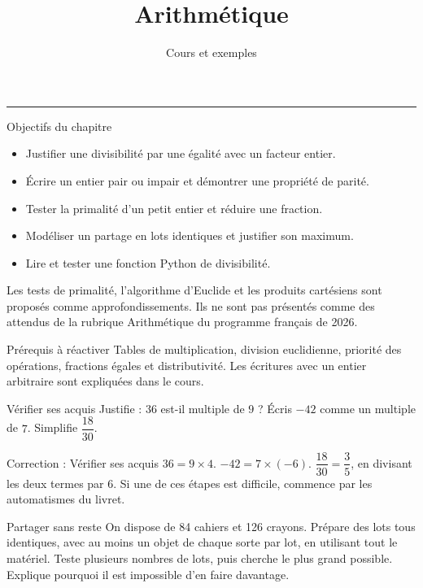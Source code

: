 \documentclass[aspectratio=169,10pt]{beamer}
\title{Arithmétique}
\subtitle{Cours et exemples}
\date{}
\author{}
\begin{document}
\begin{frame}[plain]
\vfill
{\inserttitle\par}
\medskip
{\insertsubtitle\par}
\medskip
{\rule{\textwidth}{.5pt}}
\vfill
\end{frame}
\begin{frame}{Objectifs du chapitre}
\begin{itemize}
\item Justifier une divisibilité par une égalité avec un facteur entier.
\item Écrire un entier pair ou impair et démontrer une propriété de parité.
\item Tester la primalité d’un petit entier et réduire une fraction.
\item Modéliser un partage en lots identiques et justifier son maximum.
\item Lire et tester une fonction Python de divisibilité.

\end{itemize}

Les tests de primalité, l’algorithme d’Euclide et les produits cartésiens sont proposés comme approfondissements. Ils ne sont pas présentés comme des attendus de la rubrique Arithmétique du programme français de 2026.
\end{frame}
\begin{frame}{Prérequis à réactiver}
Tables de multiplication, division euclidienne, priorité des opérations, fractions égales et distributivité. Les écritures avec un entier arbitraire sont expliquées dans le cours.
\end{frame}
\begin{frame}{Vérifier ses acquis}
Justifie : \(36\) est-il multiple de \(9\) ? Écris \(-42\) comme un multiple de \(7\). Simplifie \(\dfrac{18}{30}\).
\end{frame}
\begin{frame}{Correction : Vérifier ses acquis}
\(36=9\times4\). \(-42=7\times(-6)\). \(\dfrac{18}{30}=\dfrac{3}{5}\), en divisant les deux termes par \(6\). Si une de ces étapes est difficile, commence par les automatismes du livret.
\end{frame}
\begin{frame}{Partager sans reste}
On dispose de 84 cahiers et 126 crayons. Prépare des lots tous identiques, avec au moins un objet de chaque sorte par lot, en utilisant tout le matériel. Teste plusieurs nombres de lots, puis cherche le plus grand possible. Explique pourquoi il est impossible d’en faire davantage.
\end{frame}
\end{document}
